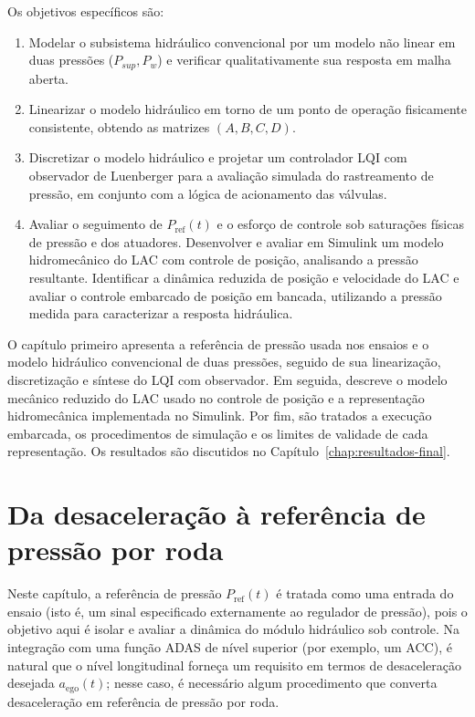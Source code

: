 Os objetivos específicos são:
\begin{enumerate}
    \item Modelar o subsistema hidráulico convencional por um modelo não linear em duas pressões ($P_{sup},P_w$) e verificar qualitativamente sua resposta em malha aberta.
    \item Linearizar o modelo hidráulico em torno de um ponto de operação fisicamente consistente, obtendo as matrizes $(A,B,C,D)$.
    \item Discretizar o modelo hidráulico e projetar um controlador LQI com observador de Luenberger para a avaliação simulada do rastreamento de pressão, em conjunto com a lógica de acionamento das válvulas.
    \item Avaliar o seguimento de $P_{\mathrm{ref}}(t)$ e o esforço de controle sob saturações físicas de pressão e dos atuadores.
    Desenvolver e avaliar em Simulink um modelo hidromecânico do LAC com controle de posição, analisando a pressão resultante.
    Identificar a dinâmica reduzida de posição e velocidade do LAC e avaliar o controle embarcado de posição em bancada, utilizando a pressão medida para caracterizar a resposta hidráulica.
\end{enumerate}

O capítulo primeiro apresenta a referência de pressão usada nos ensaios e o modelo hidráulico convencional de duas pressões, seguido de sua linearização, discretização e síntese do LQI com observador. Em seguida, descreve o modelo mecânico reduzido do LAC usado no controle de posição e a representação hidromecânica implementada no Simulink. Por fim, são tratados a execução embarcada, os procedimentos de simulação e os limites de validade de cada representação. Os resultados são discutidos no Capítulo~\ref{chap:resultados-final}.


\section{Da desaceleração à referência de pressão por roda}
\label{sec:mapeamento-aref-pressao}
Neste capítulo, a referência de pressão $P_{\mathrm{ref}}(t)$ é tratada como uma entrada do ensaio (isto é, um sinal especificado externamente ao regulador de pressão), pois o objetivo aqui é isolar e avaliar a dinâmica do módulo hidráulico sob controle. Na integração com uma função ADAS de nível superior (por exemplo, um ACC), é natural que o nível longitudinal forneça um requisito em termos de desaceleração desejada $a_{\mathrm{ego}}(t)$; nesse caso, é necessário algum procedimento que converta desaceleração em referência de pressão por roda.

